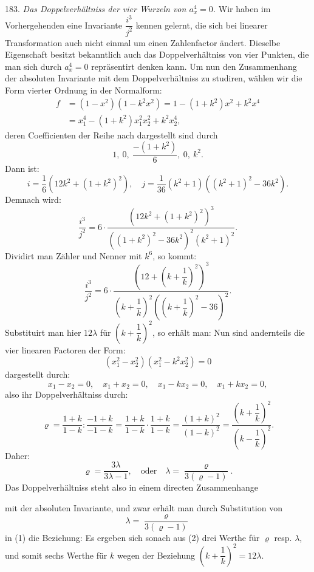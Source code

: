 183. \textit{Das Doppelverh\"altniss der vier Wurzeln von $a_x^4=0$.} Wir haben im Vorhergehenden eine Invariante $\dfrac{i^3}{j^2}$ kennen gelernt, die sich bei linearer Transformation auch nicht einmal um einen Zahlenfactor \"andert. Dieselbe Eigenschaft besitzt bekanntlich auch das Doppelverh\"altniss von vier Punkten, die man sich durch $a_x^4=0$ repr\"asentirt denken kann. Um nun den Zusammenhang der absoluten Invariante mit dem Doppelverh\"altniss zu studiren, w\"ahlen wir die Form vierter Ordnung in der  Normalform:
\[
\begin{aligned}
f &= (1-x^2)(1-k^2x^2) = 1-(1+k^2)x^2+k^2x^4\\
  &= x_1^4-(1+k^2)x_1^2x_2^2+k^2x_2^4,
\end{aligned}
\]
deren Coefficienten der Reihe nach dargestellt sind durch
\[
1,\ 0,\ \frac{-(1+k^2)}{6},\ 0,\ k^2.
\]
Dann ist:
\[
i = \frac{1}{6}(12k^2+(1+k^2)^2), \quad j = \frac{1}{36}(k^2+1)((k^2+1)^2-36k^2).
\]
Demnach wird:
\[
\frac{i^3}{j^2} = 6\cdot\frac{(12k^2+(1+k^2)^2)^3}{((1+k^2)^2-36k^2)^2(k^2+1)^2}.
\]
Dividirt man Z\"ahler und Nenner mit $k^6$, so kommt:
\[
\frac{i^3}{j^2} = 6\cdot\frac{\left(12+\left(k+\dfrac{1}{k}\right)^2\right)^3}{\left(k+\dfrac{1}{k}\right)^2\left(\left(k+\dfrac{1}{k}\right)^2-36\right)^2}.
\]
Substituirt man hier $12\lambda$ f\"ur $\left(k+\dfrac{1}{k}\right)^2$, so erh\"alt man:
Nun sind andernteils die vier linearen Factoren der Form:
\[
(x_1^2-x_2^2)(x_1^2-k^2x_2^2)=0
\]
dargestellt durch:
\[
x_1-x_2=0,\quad x_1+x_2=0,\quad x_1-kx_2=0,\quad x_1+kx_2=0,
\]
also ihr Doppelverh\"altniss durch:
\[
\varrho = \frac{1+k}{1-k}:\frac{-1+k}{-1-k} = \frac{1+k}{1-k}\cdot\frac{1+k}{1-k} = \frac{(1+k)^2}{(1-k)^2} = \frac{\left(k+\dfrac{1}{k}\right)^2}{\left(k-\dfrac{1}{k}\right)^2}.
\]
Daher:
\[
\varrho = \frac{3\lambda}{3\lambda-1}, \quad \text{oder} \quad \lambda = \frac{\varrho}{3(\varrho-1)}.
\]
Das Doppelverh\"altniss steht also in einem directen Zusammenhange


mit der absoluten Invariante, und zwar erh\"alt man durch Substitution von
\[
\lambda = \frac{\varrho}{3(\varrho-1)}
\]
in (1) die Beziehung:
Es ergeben sich sonach aus (2) drei Werthe f\"ur $\varrho$ resp. $\lambda$, und somit sechs Werthe f\"ur $k$ wegen der Beziehung $\left(k+\dfrac{1}{k}\right)^2=12\lambda$.

